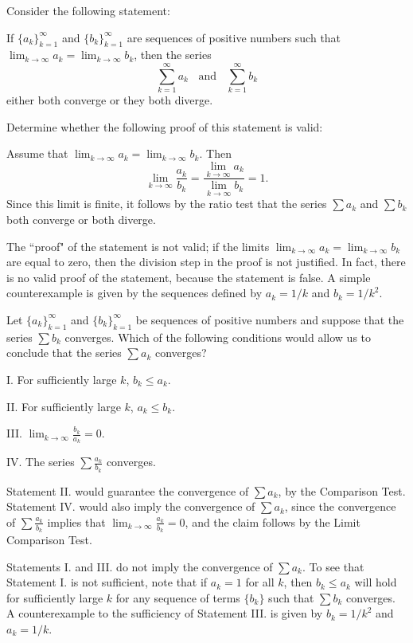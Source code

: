 \documentclass[noauthor]{ximera}
\begin{document}
\begin{problem}
Consider the following statement: 

If $\{a_k\}_{k=1}^\infty$ and $\{b_k\}_{k=1}^\infty$ are sequences of positive numbers such that $\lim_{k\rightarrow \infty} a_k = \lim_{k \rightarrow \infty} b_k$, then the series 
$$
\sum_{k=1}^\infty a_k \;\; \mbox{ and } \;\; \sum_{k=1}^\infty b_k
$$
either both converge or they both diverge. 

Determine whether the following proof of this statement is valid:

Assume that $\lim_{k\rightarrow \infty} a_k = \lim_{k \rightarrow \infty} b_k$. Then
$$
\lim_{k \rightarrow \infty} \frac{a_k}{b_k} = \frac{\lim_{k\rightarrow \infty} a_k}{\lim_{k\rightarrow \infty} b_k} = 1.
$$
Since this limit is finite, it follows by the ratio test that the series $\sum a_k$ and $\sum b_k$ both converge or both diverge. 

\begin{freeResponse}
The ``proof" of the statement is not valid; if the limits $\lim_{k\rightarrow \infty} a_k = \lim_{k \rightarrow \infty} b_k$ are equal to zero, then the division step in the proof is not justified. In fact, there is no valid proof of the statement, because the statement is false. A simple counterexample is given by the sequences defined by $a_k = 1/k$ and $b_k = 1/k^2$. 
\end{freeResponse}
\end{problem}


\begin{problem}
Let $\{a_k\}_{k=1}^\infty$ and $\{b_k\}_{k=1}^\infty$ be sequences of positive numbers and suppose that the series $\sum b_k$ converges. Which of the following conditions would allow us to conclude that the series $\sum a_k$ converges?

I. For sufficiently large $k$, $b_k \leq a_k$. 

II. For sufficiently large $k$, $a_k \leq b_k$.

III. $\lim_{k\rightarrow \infty} \frac{b_k}{a_k} = 0$.

IV. The series $\sum \frac{a_k}{b_k}$ converges. 

\begin{freeResponse}
Statement II. would guarantee the convergence of $\sum a_k$, by the Comparison Test. Statement IV. would also imply the convergence of $\sum a_k$, since the convergence of $\sum \frac{a_k}{b_k}$ implies that $\lim_{k\rightarrow \infty} \frac{a_k}{b_k} = 0$, and the claim follows by the Limit Comparison Test.


Statements I. and III. do not imply the convergence of $\sum a_k$. To see that Statement I. is not sufficient, note that if $a_k = 1$ for all $k$, then $b_k \leq a_k$ will hold for sufficiently large $k$ for any sequence of terms $\{b_k\}$ such that $\sum b_k$ converges. A counterexample to the sufficiency of Statement III. is given by $b_k = 1/k^2$ and $a_k = 1/k$.
\end{freeResponse}
\end{problem}
\end{document}
